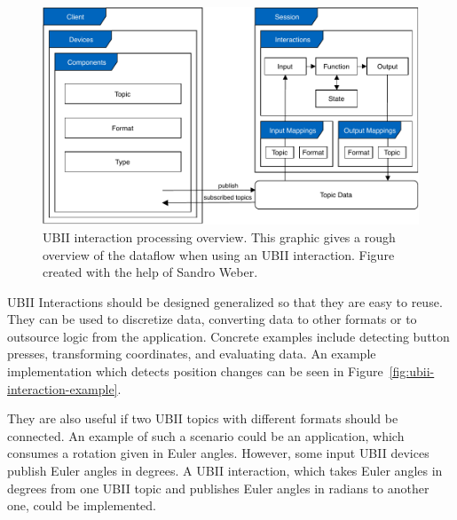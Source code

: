 \begin{figure}[htpb]
  \centering
  \includegraphics[width=12cm]{figures/implementation/ubii_cd.pdf}
  \caption[UBII communication diagram]{\ac{UBII} interaction processing overview. This graphic gives a rough overview of the dataflow when using an \ac{UBII} interaction. Figure created with the help of Sandro Weber.}\label{fig:ubii-cd}
\end{figure}

\ac{UBII} Interactions should be designed generalized so that they are easy to reuse. They can be used to discretize data, converting data to other formats or to outsource logic from the application. Concrete examples include detecting button presses, transforming coordinates, and evaluating data. An example implementation which detects position changes can be seen in Figure~\ref{fig:ubii-interaction-example}.

They are also useful if two \ac{UBII} topics with different formats should be connected. An example of such a scenario could be an application, which consumes a rotation given in Euler angles. However, some input \ac{UBII} devices publish Euler angles in degrees. A \ac{UBII} interaction, which takes Euler angles in degrees from one \ac{UBII} topic and publishes Euler angles in radians to another one, could be implemented.

